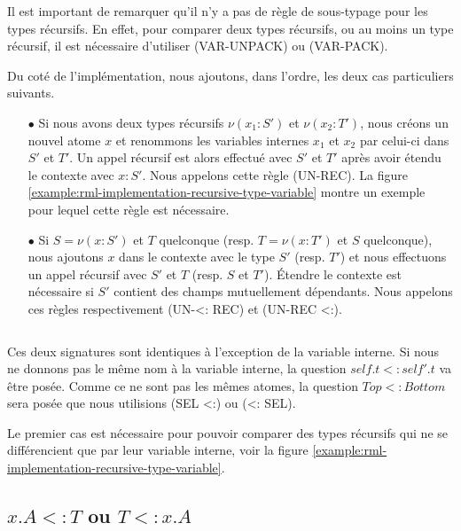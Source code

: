 Il est important de remarquer qu'il n'y a pas de règle de sous-typage pour les
types récursifs. En effet, pour comparer deux types récursifs, ou au moins un
type récursif, il est nécessaire d'utiliser (VAR-UNPACK) ou (VAR-PACK).

Du coté de l'implémentation, nous ajoutons, dans l'ordre, les deux cas
particuliers suivants.

\begin{itemize}
\item[$\bullet$] Si nous avons deux types récursifs $\nu(x_{1} : S')$ et $\nu(x_{2} : T')$,
nous créons un nouvel atome $x$ et renommons les variables internes $x_{1}$ et
$x_{2}$ par celui-ci dans $S'$ et $T'$. Un appel récursif est alors effectué
avec $S'$ et $T'$ après avoir étendu le contexte avec $x : S'$. Nous appelons
cette règle (UN-REC). La figure
\ref{example:rml-implementation-recursive-type-variable} montre un exemple pour lequel
cette règle est nécessaire.
\item[$\bullet$] Si $S = \nu(x : S')$ et $T$ quelconque (resp. $T = \nu(x : T')$ et $S$
  quelconque), nous ajoutons $x$ dans le contexte avec le type $S'$ (resp. $T'$) et
  nous effectuons un appel récursif avec $S'$ et $T$ (resp. $S$ et $T'$). Étendre
  le contexte est nécessaire si $S'$ contient des champs mutuellement dépendants.
  Nous appelons ces règles respectivement (UN-<: REC) et (UN-REC <:).
\end{itemize}

\begin{listing}
  \inputminted{OCaml}{codes/rml_implementation_recursive_type.rml}
  \caption{Ces deux signatures sont identiques à l'exception de la variable
    interne. Si nous ne donnons pas le même nom à la variable interne, la
    question $self.t <: self'.t$ va être posée. Comme ce ne sont pas les mêmes
    atomes, la question $Top <: Bottom$ sera posée que nous utilisions (SEL <:) ou
    (<: SEL).}
  \label{example:rml-implementation-recursive-type-variable}
\end{listing}

Le premier cas est nécessaire pour pouvoir comparer des types récursifs qui ne
se différencient que par leur variable interne, voir la figure
\ref{example:rml-implementation-recursive-type-variable}.

\subsection*{$x.A <: T$ ou $T <: x.A$}

